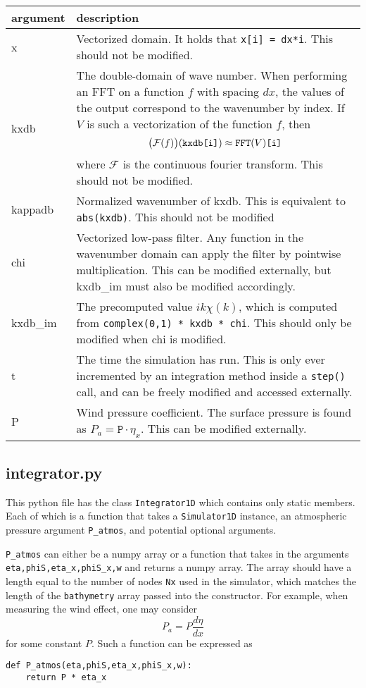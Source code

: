 \documentclass[10pt,a4paper]{article}
\newenvironment{arglist}
    {\begin{center}
    \begin{tabular}{l|p{12cm}}
    argument & description\\
    \hline
    }
    { 
    \end{tabular} 
    \end{center}
    }
\begin{document}
\begin{arglist}
x & Vectorized domain. It holds that \texttt{x[i] = dx*i}. This should not be modified.\\\hline

kxdb & The double-domain of wave number. When performing an FFT on a function $f$ with spacing $dx$, the values of the output correspond to the wavenumber by index. If $V$ is such a vectorization of the function $f$, then $$\big(\mathcal F(f)\big)(\text{\texttt{kxdb[i]}}) \approx \text{\texttt{FFT}}(V)\text{\texttt{[i]}}$$
where $\mathcal F$ is the continuous fourier transform. This should not be modified.\\\hline

kappadb & Normalized wavenumber of kxdb. This is equivalent to \texttt{abs(kxdb)}. This should not be modified\\\hline

chi & Vectorized low-pass filter. Any function in the wavenumber domain can apply the filter by pointwise multiplication. This can be modified externally, but kxdb\_im must also be modified accordingly.\\\hline

kxdb\_im & The precomputed value $ik \chi(k)$, which is computed from \texttt{complex(0,1) * kxdb * chi}. This should only be modified when chi is modified.\\\hline

t & The time the simulation has run. This is only ever incremented by an integration method inside a \texttt{step()} call, and can be freely modified and accessed externally.
\\\hline

P & Wind pressure coefficient. The surface pressure is found as $P_a = \mathtt{P}\cdot\eta_x$. This can be modified externally.
\end{arglist}


\subsection{integrator.py}
This python file has the class \texttt{Integrator1D} which contains only static members. Each of which is a function that takes a \texttt{Simulator1D} instance, an atmospheric pressure argument \texttt{P\_atmos}, and potential optional arguments.

\texttt{P\_atmos} can either be a numpy array or a function that takes in the arguments \texttt{eta,phiS,eta\_x,phiS\_x,w} and returns a numpy array. The array should have a length equal to the number of nodes \texttt{Nx} used in the simulator, which matches the length of the \texttt{bathymetry} array passed into the constructor. For example, when measuring the wind effect, one may consider
$$P_a = P\frac{d\eta}{dx}$$
for some constant $P$. Such a function can be expressed as
\begin{verbatim}
def P_atmos(eta,phiS,eta_x,phiS_x,w):
    return P * eta_x
\end{verbatim}
\end{document}
